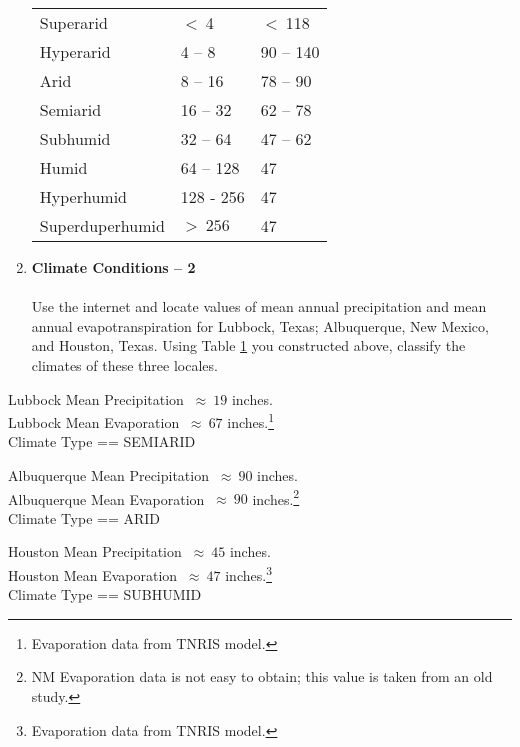 \documentclass[12pt]{article}
\begin{document}
\begin{enumerate}
\begin{table}[htbp]
\begin{tabular}{p{1.5in}p{2.25in}p{2.25in}}
   Superarid & $<~$4 & $<~$118 \\

   Hyperarid & 4 -- 8  &  90 -- 140  \\
  
   Arid & 8 -- 16 &  78 -- 90 \\

   Semiarid & 16 -- 32 & 62 -- 78 \\

   Subhumid & 32 -- 64 & 47 -- 62 \\

   Humid & 64 -- 128 & 47  \\

   Hyperhumid & 128 - 256 & 47 \\

   Superduperhumid & $>~256$ & 47 \\

\hline
\hline
   \end{tabular}
   \label{tab:climate}
\end{table}

\item{{\textbf{Climate Conditions -- 2}}}~\\~\\
Use the internet and locate values of mean annual precipitation and mean annual evapotranspiration for Lubbock, Texas; Albuquerque, New Mexico, and Houston, Texas.   Using Table \ref{tab:climate} you constructed above, classify the climates of these three locales.
\end{enumerate}
Lubbock Mean Precipitation $~\approx~19$ inches. \\
Lubbock Mean Evaporation $~\approx~67$ inches.\footnote{Evaporation data from TNRIS model.}\\
Climate Type == SEMIARID

Albuquerque Mean Precipitation $~\approx~90$ inches. \\
Albuquerque Mean Evaporation $~\approx~90$ inches.\footnote{NM Evaporation data is not easy to obtain; this value is taken from an old study.}\\
Climate Type == ARID

Houston Mean Precipitation $~\approx~45$ inches. \\
Houston Mean Evaporation $~\approx~47$ inches.\footnote{Evaporation data from TNRIS model.}\\
Climate Type == SUBHUMID
\end{document}
